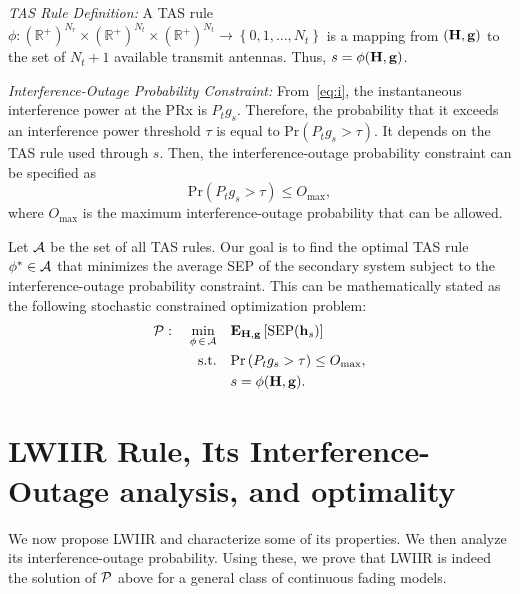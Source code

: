 \documentclass[12pt,draftcls,peerreview,onecolumn]{IEEEtran}
\newcommand{\brac}[1]{\left({#1}\right)}
\newcommand{\mtx}[1]{{\bf #1}} %
\newcommand{\explow}[2]{{\bf{E}}_{#1}\left[{#2}\right]}
\newcommand{\prob}[1]{\text{Pr}\brac{#1}}
\newcommand{\SEP}{\text{SEP}}
\newcommand{\nx}{{0}}
\newcommand{\lam}{\lambda}
\newcommand{\Nt}{{N_t}}
\newcommand{\Nr}{{N_r}}
\newcommand{\Pt}{{P_t}}
\newcommand{\puch}{g}
\newcommand{\gk}[1]{{\puch_{#1}}}
\newcommand{\g}{\mathbf{\puch}}
\newcommand{\outmax}{O_{\text{max}}}
\newcommand{\itau}{\tau}
\newcommand{\allopts}{\left\{\nx,1,\ldots,\Nt\right\}}
\newcommand{\asrule}{\phi}
\newcommand{\asspan}{{\cal A}}
\newcommand{\Hmx}{\mtx{H}}
\newcommand{\optproblem}{{\cal P}}
\begin{document}
{\em TAS Rule Definition:} A TAS rule $\asrule:\brac{\mathbb{R}^{+}}^{\Nr}\times\brac{\mathbb{R}^{+}}^{\Nt} \times \brac{\mathbb{R}^{+}}^{\Nt} \rightarrow \allopts$ is a mapping from $\left(\Hmx,\g\right)$ to the set of $\Nt+1$ available transmit antennas. Thus, $s = \phi(\Hmx,\g)$.

{\em Interference-Outage Probability Constraint:}
From~\eqref{eq:i}, the instantaneous interference power at the PRx is $\Pt\gk{s}$. Therefore, the probability that it exceeds an interference power threshold $\itau$ is equal to $\prob{\Pt\gk{s}>\itau}$. It depends on the TAS rule used through $s$. Then, the interference-outage probability constraint can be specified as 
\begin{equation}
\prob{\Pt\gk{s}>\itau} \leq \outmax,
\label{eq:iop_cons}
\end{equation}
where $\outmax$ is the maximum interference-outage probability that can be allowed. 


Let $\asspan$ be the set of all TAS rules. Our goal is to find the optimal TAS rule $\phi^{*}\in\asspan$ that minimizes the average SEP of the secondary system subject to the interference-outage probability constraint. This can be mathematically stated as the  following stochastic constrained optimization problem:
\begin{align}
\label{eq:objective}
\optproblem: \quad \min_{\asrule\,\in\,\asspan} \quad &\explow{\Hmx,\g}{\SEP(\hs)} \\
\text{s.t.} \quad &\prob{\Pt\gk{s}>\itau} \leq \outmax, \\
 &s = \phi(\Hmx,\g). 
\end{align}



\section{LWIIR Rule, Its Interference-Outage analysis, and optimality}
\label{sec:analysis}

We now propose LWIIR and characterize some of its properties.  We then analyze its interference-outage probability. Using these, we prove that LWIIR is indeed the solution of  $\optproblem$ above for a general class of continuous fading models. %
\end{document}
